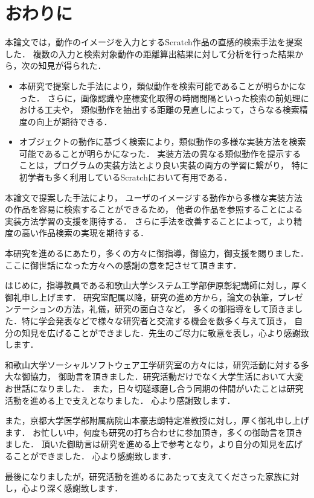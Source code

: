 \documentclass[11pt]{jreport}
\begin{document}
\chapter{おわりに}
本論文では，動作のイメージを入力とするScratch作品の直感的検索手法を提案した．
複数の入力と検索対象動作の距離算出結果に対して分析を行った結果から，次の知見が得られた．

\begin{itemize}
    \item 本研究で提案した手法により，類似動作を検索可能であることが明らかになった．
    さらに，画像認識や座標変化取得の時間間隔といった検索の前処理における工夫や，
    類似動作を抽出する距離の見直しによって，さらなる検索精度の向上が期待できる．
    \item オブジェクトの動作に基づく検索により，類似動作の多様な実装方法を検索可能であることが明らかになった．
    実装方法の異なる類似動作を提示することは，プログラムの実装方法とより良い実装の両方の学習に繋がり，
    特に初学者も多く利用しているScratchにおいて有用である．
\end{itemize}

本論文で提案した手法により，
ユーザのイメージする動作から多様な実装方法の作品を容易に検索することができるため，
他者の作品を参照することによる実装方法学習の支援を期待する．
さらに手法を改善することによって，より精度の高い作品検索の実現を期待する．



 \begin{acknowledgements}
    本研究を進めるにあたり，多くの方々に御指導，御協力，御支援を賜りました．
    ここに御世話になった方々への感謝の意を記させて頂きます．
    
    はじめに，指導教員である和歌山大学システム工学部伊原彰紀講師に対し，厚く御礼申し上げます．
    研究室配属以降，研究の進め方から，論文の執筆，プレゼンテーションの方法，礼儀，研究の面白さなど，
    多くの御指導をして頂きました．特に学会発表などで様々な研究者と交流する機会を数多く与えて頂き，
    自分の知見を広げることができました．先生のご尽力に敬意を表し，心より感謝致します．
    
    和歌山大学ソーシャルソフトウェア工学研究室の方々には，研究活動に対する多大な御協力，
    御助言を頂きました．研究活動だけでなく大学生活において大変お世話になりました．
    また，日々切磋琢磨し合う同期の仲間がいたことは研究活動を進める上で支えとなりました．
    心より感謝致します．
    
   また，京都大学医学部附属病院山本豪志朗特定准教授に対し，厚く御礼申し上げます．
   お忙しい中，何度も研究の打ち合わせに参加頂き，多くの御助言を頂きました．
   頂いた御助言は研究を進める上で参考となり，より自分の知見を広げることができました．
   心より感謝致します．
    
    最後になりましたが，研究活動を進めるにあたって支えてくださった家族に対し，心より深く感謝致します．
 \end{acknowledgements}
\end{document}
